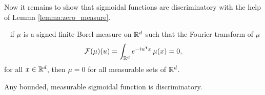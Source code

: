 Now it remains to show that sigmoidal functions are discriminatory with the help
of Lemma \ref{lemma:zero_measure}.

\begin{lemma}~\cite{rudinFunctionalAnalysis1991}
    \label{lemma:zero_measure}
    if $\mu$ is a signed finite Borel measure on $\mathbb{R}^d$ such that the Fourier
    transform of $\mu$
    \begin{equation}
        \mathcal{F}(\mu)(u) = \int_{\mathbb{R}^d} e^{-iu{}^{\intercal} x} \,\mu(x) = 0,  
    \end{equation}
    for all $x\in\mathbb{R}^d$, then $\mu = 0$ for all measurable sets of $\mathbb{R}^d$.
\end{lemma}

\begin{lemma}
    Any bounded, measurable sigmoidal function is discriminatory.
\end{lemma}

